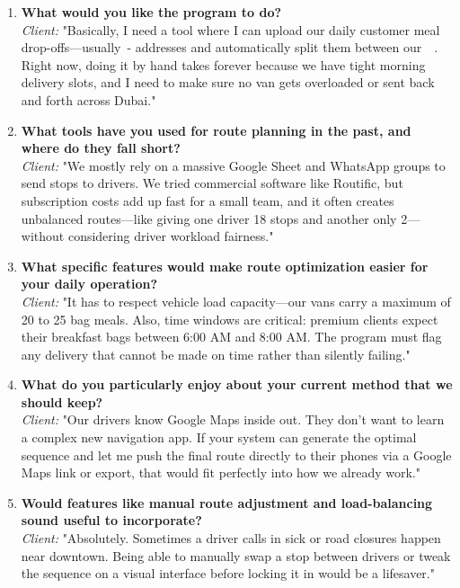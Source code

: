 \documentclass[11pt]{article}
\begin{document}
\begin{enumerate}[label={\LARGE Q\arabic*\,}]
    \item \textbf{What would you like the program to do?} \\
    \textit{Client:} "Basically, I need a tool where I can upload our daily customer meal drop-offs—usually~\rangeofdeliveries- addresses and automatically split them between our~\numberofvehicles~. Right now, doing it by hand takes forever because we have tight morning delivery slots, and I need to make sure no van gets overloaded or sent back and forth across Dubai."


    \item \textbf{What tools have you used for route planning in the past, and where do they fall short?} \\
    \textit{Client:} "We mostly rely on a massive Google Sheet and WhatsApp groups to send stops to drivers. We tried commercial software like Routific, but subscription costs add up fast for a small team, and it often creates unbalanced routes—like giving one driver 18 stops and another only 2—without considering driver workload fairness."

    \item \textbf{What specific features would make route optimization easier for your daily operation?} \\
    \textit{Client:} "It has to respect vehicle load capacity—our vans carry a maximum of 20 to 25 bag meals. Also, time windows are critical: premium clients expect their breakfast bags between 6:00 AM and 8:00 AM. The program must flag any delivery that cannot be made on time rather than silently failing."

    \item \textbf{What do you particularly enjoy about your current method that we should keep?} \\
    \textit{Client:} "Our drivers know Google Maps inside out. They don't want to learn a complex new navigation app. If your system can generate the optimal sequence and let me push the final route directly to their phones via a Google Maps link or export, that would fit perfectly into how we already work."

    \item \textbf{Would features like manual route adjustment and load-balancing sound useful to incorporate?} \\
    \textit{Client:} "Absolutely. Sometimes a driver calls in sick or road closures happen near downtown. Being able to manually swap a stop between drivers or tweak the sequence on a visual interface before locking it in would be a lifesaver."


\end{enumerate}
\end{document}
